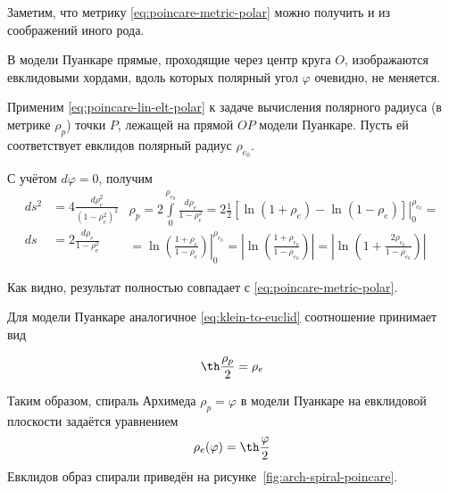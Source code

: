 \documentclass{article}
\numberwithin{equation}{section}
\renewcommand{\phi}{\varphi}
\providecommand{\abs}[1]{\left \lvert{#1}\right \rvert}
\begin{document}
Заметим, что метрику \eqref{eq:poincare-metric-polar} можно
получить и из соображений иного рода.

В модели Пуанкаре прямые, проходящие через центр круга $O$,
изображаются евклидовыми хордами, вдоль которых полярный угол $\phi$
очевидно, не меняется.

Применим \eqref{eq:poincare-lin-elt-polar} к задаче вычисления
полярного радиуса (в метрике $\rho_p$) точки $P$, лежащей на прямой
$OP$ модели Пуанкаре. Пусть ей соответствует евклидов полярный радиус
$\rho_{e_0}$.

С учётом $d\phi=0$, получим
\begin{subequations}
  \begin{equation*}
    \begin{split}
      ds^2&=4\frac{d\rho_e^2}{(1-\rho_e^2)^2} \\
      ds &= 2\frac{d\rho_e}{1-\rho_e^2} \\
    \end{split}
  \end{equation*}
  \begin{multline*}
    \rho_p = 2\int\limits_0^{\rho_{e_0}} \frac{d\rho_e}{1-\rho_e^2} =
     2 \frac{1}{2} \left . \left [ \ln(1+\rho_e) - \ln(1-\rho_e)
       \right ] \right\rvert_0^{\rho_{e_0}} = \\
     = \left . \ln{\left( \frac{1+\rho_e}{1-\rho_e} \right)} \right
     \rvert_0^{\rho_{e_0}} =
     \abs{ \ln{\left(\frac{1+\rho_{e_0}}{1-\rho_{e_0}} \right)}} =
     \abs{ \ln{\left(1+\frac{2\rho_{e_0}}{1-\rho_{e_0}} \right)}}
  \end{multline*}
\end{subequations}

Как видно, результат полностью совпадает с
\eqref{eq:poincare-metric-polar}.

Для модели Пуанкаре аналогичное \eqref{eq:klein-to-euclid} соотношение
принимает вид

\begin{equation}\label{eq:poincare-to-euclid}
  \th \frac{\rho_p}{2} = \rho_e
\end{equation}

Таким образом, спираль Архимеда $\rho_p = \phi$ в модели Пуанкаре на
евклидовой плоскости задаётся уравнением
\begin{equation}\label{eq:arch-spiral-poincare}
  \rho_e(\phi) = \th\frac{\phi}{2}
\end{equation}
Евклидов образ спирали приведён на рисунке \ref{fig:arch-spiral-poincare}.
\end{document}
